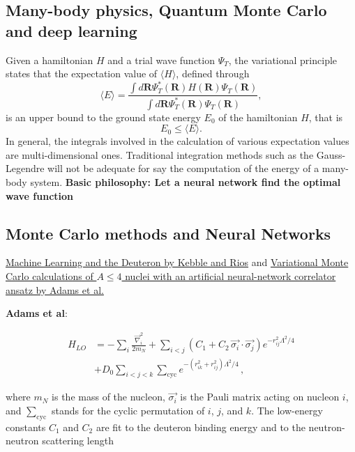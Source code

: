 \documentclass[%
oneside,                 %
final,                   %
10pt]{article}
\begin{document}
\subsection{Many-body physics, Quantum Monte Carlo and deep learning}
\begin{block}{}
Given a hamiltonian $H$ and a trial wave function $\Psi_T$, the variational principle states that the expectation value of $\langle H \rangle$, defined through 
\[
   \langle E \rangle =
   \frac{\int d\bm{R}\Psi^{\ast}_T(\bm{R})H(\bm{R})\Psi_T(\bm{R})}
        {\int d\bm{R}\Psi^{\ast}_T(\bm{R})\Psi_T(\bm{R})},
\]
is an upper bound to the ground state energy $E_0$ of the hamiltonian $H$, that is 
\[
    E_0 \le \langle E \rangle.
\]
In general, the integrals involved in the calculation of various  expectation values  are multi-dimensional ones. Traditional integration methods such as the Gauss-Legendre will not be adequate for say the  computation of the energy of a many-body system.  \textbf{Basic philosophy: Let a neural network find the optimal wave function}
\end{block}

\subsection{Monte Carlo methods and Neural Networks}

\href{{https://www.sciencedirect.com/science/article/pii/S0370269320305463?via%3Dihub}}{Machine Learning and the Deuteron by Kebble and Rios} and
\href{{https://journals.aps.org/prl/abstract/10.1103/PhysRevLett.127.022502}}{Variational Monte Carlo calculations of $A\le 4$ nuclei with an artificial neural-network correlator ansatz by Adams et al.}

\textbf{Adams et al}:

\begin{align}
H_{LO} &=-\sum_i \frac{{\vec{\nabla}_i^2}}{2m_N}
+\sum_{i<j} {\left(C_1  + C_2\, \vec{\sigma_i}\cdot\vec{\sigma_j}\right)
e^{-r_{ij}^2\Lambda^2 / 4 }}
\nonumber\\
&+D_0 \sum_{i<j<k} \sum_{\text{cyc}}
{e^{-\left(r_{ik}^2+r_{ij}^2\right)\Lambda^2/4}}\,,
\end{align}

where $m_N$ is the mass of the nucleon, $\vec{\sigma_i}$ is the Pauli
matrix acting on nucleon $i$, and $\sum_{\text{cyc}}$ stands for the
cyclic permutation of $i$, $j$, and $k$. The low-energy constants
$C_1$ and $C_2$ are fit to the deuteron binding energy and to the
neutron-neutron scattering length
\end{document}
